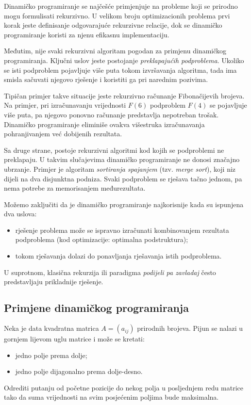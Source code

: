 Dinamičko programiranje se najčešće primjenjuje na probleme koji se prirodno mogu formulisati rekurzivno. U velikom broju optimizacionih problema prvi korak jeste definisanje odgovarajuće rekurzivne relacije, dok se dinamičko programiranje koristi za njenu efikasnu implementaciju.

Međutim, nije svaki rekurzivni algoritam pogodan za primjenu dinamičkog programiranja. Ključni uslov jeste postojanje \textit{preklapajućih podproblema}. Ukoliko se isti podproblem pojavljuje više puta tokom izvršavanja algoritma, tada ima smisla sačuvati njegovo rješenje i koristiti ga pri narednim pozivima.

Tipičan primjer takve situacije jeste rekurzivno računanje Fibonačijevih brojeva. Na primjer, pri izračunavanju vrijednosti $F(6)$ podproblem $F(4)$ se pojavljuje više puta, pa njegovo ponovno računanje predstavlja nepotreban trošak. Dinamičko programiranje eliminiše ovakva višestruka izračunavanja pohranjivanjem već dobijenih rezultata.

Sa druge strane, postoje rekurzivni algoritmi kod kojih se podproblemi ne preklapaju. U takvim slučajevima dinamičko programiranje ne donosi značajno ubrzanje. Primjer je algoritam \emph{sortiranja spajanjem} (tzv. \emph{merge sort}), koji niz dijeli na dva disjunktna podniza. Svaki podproblem se rješava tačno jednom, pa nema potrebe za memorisanjem međurezultata.

Možemo zaključiti da je dinamičko programiranje najkorisnije kada su ispunjena dva uslova:

\begin{itemize}
	\item rješenje problema može se ispravno izračunati kombinovanjem rezultata podproblema (kod optimizacije: optimalna podstruktura);
	\item tokom rješavanja dolazi do ponavljanja rješavanja istih podproblema.
\end{itemize}

U suprotnom, klasična rekurzija ili paradigma \emph{podijeli pa zavladaj} često predstavljaju prikladnije rješenje.

\subsection{Primjene dinamičkog programiranja}

\begin{example}
	Neka je data kvadratna matrica $A=(a_{ij})$ prirodnih brojeva. Pijun se nalazi u gornjem lijevom uglu matrice i može se kretati:
	\begin{itemize}
		\item jedno polje prema dolje;
		\item jedno polje dijagonalno prema dolje-desno.
	\end{itemize}
	
	Odrediti putanju od početne pozicije do nekog polja u posljednjem redu matrice tako da suma vrijednosti na svim posjećenim poljima bude maksimalna.
	
\end{example}


